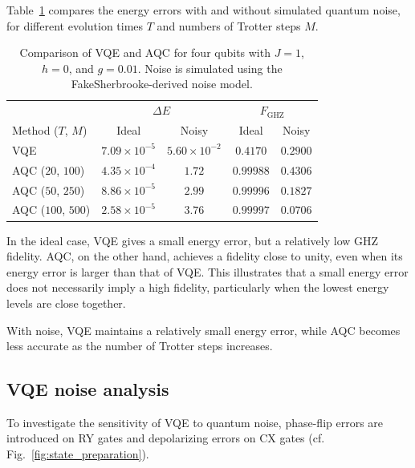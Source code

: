 \documentclass[aps,prl,reprint,amsmath,amssymb,twocolumn,preprintnumbers,superscriptaddress,10pt]{revtex4-2}
\begin{document}
Table~\ref{tab:comparison} compares the energy errors with and without simulated quantum noise, for different evolution times $T$ and numbers of Trotter steps $M$.



\begin{table}[ht]
    \centering
    \caption{Comparison of VQE and AQC for four qubits
    with $J=1$, $h=0$, and $g=0.01$. Noise is simulated
    using the FakeSherbrooke-derived noise model.}
    \label{tab:comparison}
    \begin{tabular}{lcccc}
        \hline
        & \multicolumn{2}{c}{$\Delta E$}
        & \multicolumn{2}{c}{$F_{\mathrm{GHZ}}$} \\
        Method ($T$, $M$)& Ideal & Noisy & Ideal & Noisy \\
        \hline
        VQE
            & $7.09\times10^{-5}$ & $5.60\times10^{-2}$
            & $0.4170$ & $0.2900$ \\
        AQC ($20$, $100$)
            & $4.35\times10^{-4}$ & $1.72$
            & $0.99988$ & $0.4306$ \\
        AQC ($50$, $250$)
            & $8.86\times10^{-5}$ & $2.99$
            & $0.99996$ & $0.1827$ \\
        AQC ($100$, $500$)
            & $2.58\times10^{-5}$ & $3.76$
            & $0.99997$ & $0.0706$ \\
        \hline
    \end{tabular}
\end{table}



In the ideal case, VQE gives a small energy error, but a relatively low GHZ fidelity. 
AQC, on the other hand, achieves a fidelity close to unity, even when its energy error is larger than that of VQE.
This illustrates that a small energy error does not necessarily imply a high fidelity, particularly when the lowest energy levels are close together.

With noise, VQE maintains a relatively small energy error, while AQC becomes less accurate as the number of Trotter steps increases.

\subsection{VQE noise analysis}

To investigate the sensitivity of VQE to quantum noise, phase-flip errors are introduced on RY gates and depolarizing errors on CX gates (cf. Fig.~\ref{fig:state_preparation}).
\end{document}
